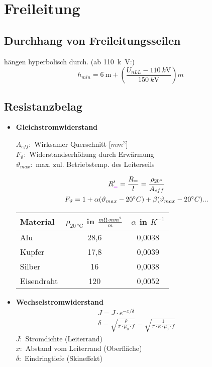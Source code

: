\section{Freileitung}
\subsection{Durchhang von Freileitungsseilen}
hängen hyperbolisch durch. (ab \SI{110}{k\volt}:)
\begin{equation*}
    h_{min} = \SI{6}{\metre} + \left(\frac{U_{\mathit{nLL}} - \SI{110}{k\volt}}{\SI{150}{k\volt}}\right)m
\end{equation*}
\subsection{Resistanzbelag}
\begin{itemize}
\item[]{\textbf{Gleichstromwiderstand}}

$A_{\mathit{eff}}:$ Wirksamer Querschnitt [$mm^2$]\\
$F_{\vartheta}:$ Widerstandserhöhung durch Erwärmung\\
$\vartheta_{max}:$ max. zul. Betriebstemp. des Leiterseils

\begin{gather*}
    R_{\textcolor{purple}{=}}' = \frac{R_{=}}{l} = \frac{\rho_{20 \degree}}{A_{eff}}\\
    F_{\vartheta} = 1 + \alpha (\vartheta_{max} - 20\degree C) + \beta (\vartheta_{max} - 20\degree C)...
\end{gather*}

\begin{table}[h]
\centering
\begin{tabular}[h]{|l|c|c|}
    \hline
    Material & $\rho_{\SI{20}{\degreeCelsius}}$ in $\frac{m\ohm \cdot mm^2}{m}$ & $\alpha$ in $K^{-1}$ \\
    \hline
    Alu & 28,6 & 0,0038 \\
    \hline
    Kupfer & 17,8 & 0,0039 \\
    \hline
    Silber & 16 & 0,0038 \\
    \hline
    Eisendraht & 120 & 0,0052 \\
    \hline
\end{tabular}
\end{table}

\item[]{\textbf{Wechselstromwiderstand}}
\begin{gather*}
    J = J \cdot e^{-x/\delta}\\
    \delta = \sqrt{ \frac{\rho}{\pi \cdot \mu_{0} \cdot f}}
     = \sqrt{ \frac{1}{\pi \cdot \kappa \cdot \mu_{0} \cdot f}}
\end{gather*}
$J:$ Stromdichte (Leiterrand)\\
$x:$ Abstand vom Leiterrand (Oberfläche)\\
$\delta:$ Eindringtiefe (Skineffekt)\\


\end{itemize}
